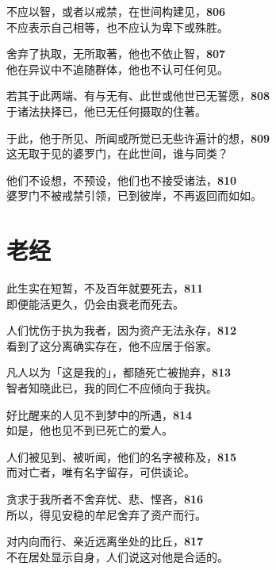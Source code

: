 不应以智，或者以戒禁，在世间构建见，\hfill{\grayfootnotesize \textbf{806}} \\
不应表示自己相等，也不应认为卑下或殊胜。


舍弃了执取，无所取著，他也不依止智，\hfill{\grayfootnotesize \textbf{807}} \\
他在异议中不追随群体，他也不认可任何见。


若其于此两端、有与无有、此世或他世已无誓愿，\hfill{\grayfootnotesize \textbf{808}} \\
于诸法抉择已，他已无任何摄取的住著。


于此，他于所见、所闻或所觉已无些许遍计的想，\hfill{\grayfootnotesize \textbf{809}} \\
这无取于见的婆罗门，在此世间，谁与同类？


他们不设想，不预设，他们也不接受诸法，\hfill{\grayfootnotesize \textbf{810}} \\
婆罗门不被戒禁引领，已到彼岸，不再返回而如如。


\section{老经}


此生实在短暂，不及百年就要死去，\hfill{\grayfootnotesize \textbf{811}} \\
即便能活更久，仍会由衰老而死去。


人们忧伤于执为我者，因为资产无法永存，\hfill{\grayfootnotesize \textbf{812}} \\
看到了这分离确实存在，他不应居于俗家。


凡人以为「这是我的」，都随死亡被抛弃，\hfill{\grayfootnotesize \textbf{813}} \\
智者知晓此已，我的同仁不应倾向于我执。


好比醒来的人见不到梦中的所遇，\hfill{\grayfootnotesize \textbf{814}} \\
如是，他也见不到已死亡的爱人。


人们被见到、被听闻，他们的名字被称及，\hfill{\grayfootnotesize \textbf{815}} \\
而对亡者，唯有名字留存，可供谈论。


贪求于我所者不舍弃忧、悲、悭吝，\hfill{\grayfootnotesize \textbf{816}} \\
所以，得见安稳的牟尼舍弃了资产而行。


对内向而行、亲近远离坐处的比丘，\hfill{\grayfootnotesize \textbf{817}} \\
不在居处显示自身，人们说这对他是合适的。


